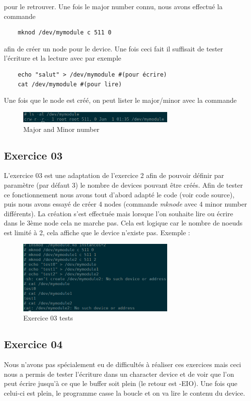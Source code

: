 \documentclass{ReportTemplate}
\begin{document}
pour le retrouver. Une fois le major number connu, nous avons effectué la
commande
\begin{verbatim}
    mknod /dev/mymodule c 511 0
\end{verbatim}
afin de créer un node pour le device. Une fois ceci fait il suffisait de tester
l'écriture et la lecture avec par exemple
\begin{verbatim}
    echo "salut" > /dev/mymodule #(pour écrire)
    cat /dev/mymodule #(pour lire)
\end{verbatim} 
Une fois que le node est créé, on peut lister le major/minor avec la commande 
\begin{figure}[H]
    \centering
    \includegraphics[width=0.7\textwidth]{imageSources/MajorMinor.png}
    \caption{Major and Minor number}
    \label{fig:MajorMinor}
\end{figure}
\newpage
\subsection{Exercice 03}
L'exercice 03 est une adaptation de l'exercice 2 afin de pouvoir définir par
paramètre (par défaut 3) le nombre de devices pouvant être créés. Afin de tester
ce fonctionnement nous avons tout d'abord adapté le code (voir code source),
puis nous avons essayé de créer 4 nodes (commande \textit{mknode} avec 4 minor
number différents). La création s'est effectuée mais lorsque l'on souhaite lire
ou écrire dans le 3ème node cela ne marche pas. Cela est logique car le nombre
de noeuds est limité à 2, cela affiche que le device n'existe pas. Exemple :
\begin{figure}[H]
    \centering
    \includegraphics[width=0.7\textwidth]{imageSources/Ex3_cDev.png}
    \caption{Exercice 03 tests}
    \label{fig:Ex3Tests}
\end{figure}
\subsection{Exercice 04}
Nous n'avons pas spécialement eu de difficultés à réaliser ces exercices mais
ceci nous a permis de tester l'écriture dans un character device et de voir que
l'on peut écrire jusqu'à ce que le buffer soit plein (le retour est -EIO). Une
fois que celui-ci est plein, le programme casse la boucle et on va lire le
contenu du device.
\end{document}
